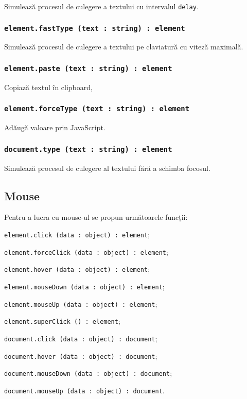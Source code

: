 Simulează procesul de culegere a textului cu intervalul \texttt{delay}.

\subsubsection{\texttt{element.fastType (text : string) : element}}

Simulează procesul de culegere a textului pe claviatură cu viteză maximală.

\subsubsection{\texttt{element.paste (text : string) : element}}

Copiază textul în clipboard, 

\subsubsection{\texttt{element.forceType (text : string) : element}}

Adăugă valoare prin JavaScript.

\subsubsection{\texttt{document.type (text : string) : element}}

Simulează procesul de culegere al textului fără a schimba focosul.

\subsection{Mouse}
\label{mouse}

Pentru a lucra cu mouse-ul se propun următoarele funcții:
\begin{icItems}
	\item \texttt{element.click (data : object) : element};
	\item \texttt{element.forceClick (data : object) : element};
	\item \texttt{element.hover (data : object) : element};
	\item \texttt{element.mouseDown (data : object) : element};
	\item \texttt{element.mouseUp (data : object) : element};
	\item \texttt{element.superClick () : element};
	\item \texttt{document.click (data : object) : document};
	\item \texttt{document.hover (data : object) : document};
	\item \texttt{document.mouseDown (data : object) : document};
	\item \texttt{document.mouseUp (data : object) : document}.
\end{icItems}

